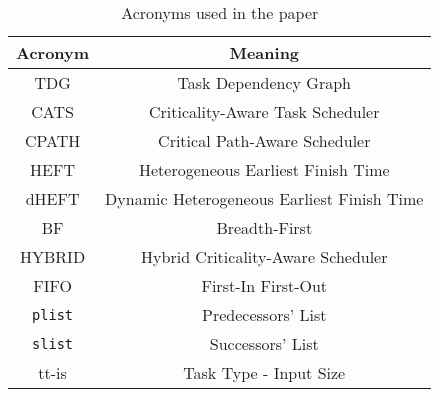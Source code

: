  

\begin{table}
\begin{center}
\caption{Acronyms used in the paper }
\label{tab.acronyms}
\begin{tabular}{|c|c|}
\hline
 \textbf{Acronym} & \textbf{Meaning}\\\hline\hline
TDG & Task Dependency Graph \\
CATS & Criticality-Aware Task Scheduler\\
CPATH & Critical Path-Aware Scheduler\\
HEFT & Heterogeneous Earliest Finish Time\\
dHEFT & Dynamic Heterogeneous Earliest Finish Time\\
BF & Breadth-First\\
HYBRID & Hybrid Criticality-Aware Scheduler\\
FIFO & First-In First-Out\\
\texttt{plist} & Predecessors' List\\
\texttt{slist} & Successors' List\\
tt-is & Task Type - Input Size\\
\hline
\end{tabular} 
\end{center}
\vspace{-0.4cm}
\end{table}